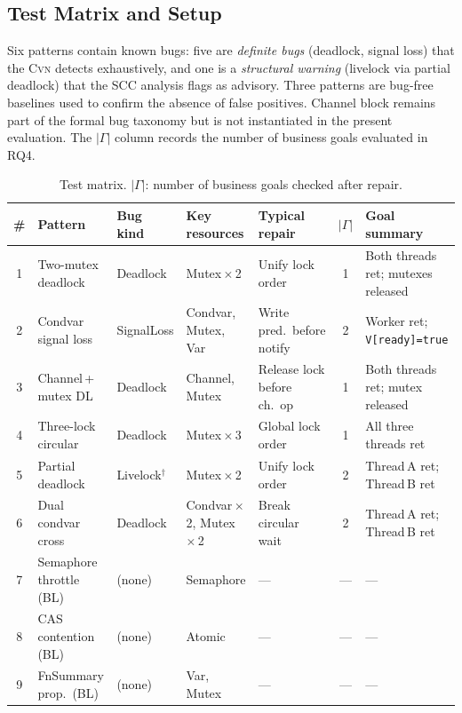 \documentclass[sigconf]{acmart}
\begin{document}
\subsection{Test Matrix and Setup}
\label{subsec:test-matrix}

Six patterns contain known bugs: five are \emph{definite bugs} (deadlock, signal loss) that the \textsc{Cvn} detects exhaustively, and one is a \emph{structural warning} (livelock via partial deadlock) that the SCC analysis flags as advisory. Three patterns are bug-free baselines used to confirm the absence of false positives. Channel block remains part of the formal bug taxonomy but is not instantiated in the present evaluation. The $|\Gamma|$ column records the number of business goals evaluated in RQ4.

\begin{table}[t]
\caption{Test matrix.
$|\Gamma|$: number of business goals checked after repair.}
\label{tab:test-matrix}
\centering\footnotesize
\begin{tabular}{@{}cllll c p{2.6cm}@{}}
\toprule
\textbf{\#} & \textbf{Pattern} & \textbf{Bug kind}
  & \textbf{Key resources}
  & \textbf{Typical repair}
  & $|\Gamma|$
  & \textbf{Goal summary} \\
\midrule
1  & Two-mutex deadlock
   & Deadlock & Mutex\,$\times$\,2
   & Unify lock order
   & 1 & Both threads ret; mutexes released \\[2pt]
2  & Condvar signal loss
   & SignalLoss & Condvar, Mutex, Var
   & Write pred.\ before notify
   & 2 & Worker ret; \texttt{V[ready]=true} \\[2pt]
3  & Channel\,+\,mutex DL
   & Deadlock & Channel, Mutex
   & Release lock before ch.\ op
   & 1 & Both threads ret; mutex released \\[2pt]
4  & Three-lock circular
   & Deadlock & Mutex\,$\times$\,3
   & Global lock order
   & 1 & All three threads ret \\[2pt]
5  & Partial deadlock
   & Livelock$^\dagger$ & Mutex\,$\times$\,2
   & Unify lock order
   & 2 & Thread\,A ret; Thread\,B ret \\[2pt]
6  & Dual condvar cross
   & Deadlock & Condvar\,$\times$\,2, Mutex\,$\times$\,2
   & Break circular wait
   & 2 & Thread\,A ret; Thread\,B ret \\[2pt]
\midrule
7  & Semaphore throttle \textsf{(BL)}
   & (none) & Semaphore
   & --- & --- & --- \\[2pt]
8  & CAS contention \textsf{(BL)}
   & (none) & Atomic
   & --- & --- & --- \\[2pt]
9  & FnSummary prop.\ \textsf{(BL)}
   & (none) & Var, Mutex
   & --- & --- & --- \\
\bottomrule
\end{tabular}
\end{table}
\end{document}
